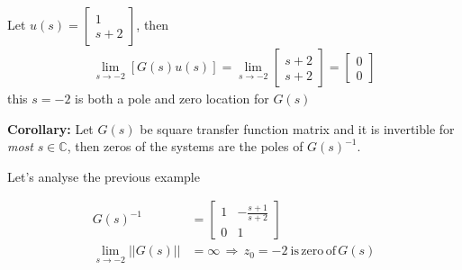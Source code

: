 \documentclass[twoside]{article}
\begin{document}
Let $u(s) = \begin{bmatrix} 1 \\ s+2 \end{bmatrix}$, then
\begin{align*}
\lim_{s \to -2} [ G(s) u(s) ] = \lim_{s \to -2} \begin{bmatrix} s+2 \\ s+2 \end{bmatrix} = \begin{bmatrix} 0 \\ 0 \end{bmatrix}
\end{align*}
this $s = -2$ is both a pole and zero location for $G(s)$

\textbf{Corollary:} Let $G(s)$ be square transfer function matrix and it is invertible for \textit{most} $s \in \mathbb{C}$, then zeros of the systems
are the poles of $G(s)^{-1}$. 

Let's analyse the previous example 

\begin{align*}
G(s)^{-1} &= \left[ \begin{array}{ccc} 1 & -\frac{s+1}{s+2}  \\  
	0 & 1  \end{array} \right]
	\\
\lim_{s \to -2} || G(s) || &= \infty \, \Rightarrow \, z_0 = - 2 \ \mathrm{is} \, \mathrm{zero} \, \mathrm{of} \, G(s)
\end{align*}







\end{document}
